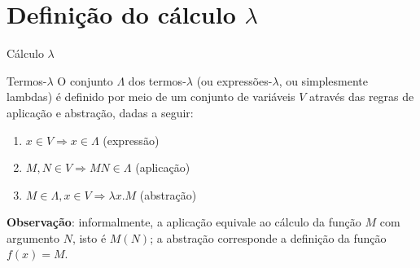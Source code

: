 \section{Definição do cálculo $\lambda$}

\begin{frame}[fragile]{Cálculo $\lambda$}

    \begin{block}{Termos-$\lambda$}
        O conjunto $\Lambda$ dos termos-$\lambda$ (ou expressões-$\lambda$, ou 
        simplesmente lambdas) é definido por
        meio de um conjunto de variáveis $V$ através das regras de aplicação e abstração,
        dadas a seguir:
        \begin{enumerate}
            \item $x\in V \Rightarrow x\in \Lambda$ (expressão)
            \item $M, N\in V \Rightarrow MN\in \Lambda$ (aplicação)
            \item $M\in \Lambda, x\in V \Rightarrow \lambda x.M$ (abstração)
        \end{enumerate}
    \end{block}

    \vspace{0.1in}

    \textbf{Observação}: informalmente, a aplicação equivale ao cálculo da função 
        $M$ com argumento $N$, isto é $M(N)$; a abstração corresponde a definição da função 
        $f(x) = M$.

\end{frame}

